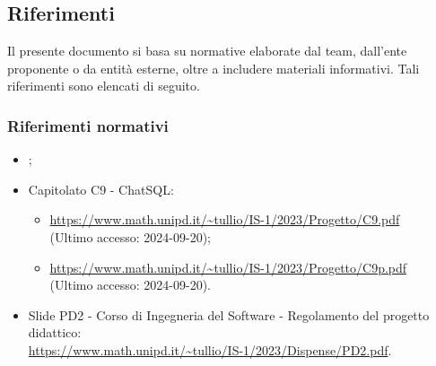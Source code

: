 \subsection{Riferimenti}
Il presente documento si basa su normative elaborate dal team, dall'ente proponente o da entità esterne, oltre a includere materiali informativi. Tali riferimenti sono elencati di seguito.
\subsubsection{Riferimenti normativi}
\begin{itemize}
  \item \NormeDiProgetto;
  \item Capitolato C9 - ChatSQL:
  \begin{itemize}
    \item \href{https://www.math.unipd.it/~tullio/IS-1/2023/Progetto/C9.pdf}{https://www.math.unipd.it/\textasciitilde tullio/IS-1/2023/Progetto/C9.pdf} \\ (Ultimo accesso: 2024-09-20);
    \item \href{https://www.math.unipd.it/~tullio/IS-1/2023/Progetto/C9.pdf}{https://www.math.unipd.it/\textasciitilde tullio/IS-1/2023/Progetto/C9p.pdf} \\ (Ultimo accesso: 2024-09-20).
  \end{itemize}
  \item Slide PD2 - Corso di Ingegneria del Software - Regolamento del progetto didattico:\\ \href{https://www.math.unipd.it/~tullio/IS-1/2023/Dispense/PD2.pdf}{https://www.math.unipd.it/\textasciitilde tullio/IS-1/2023/Dispense/PD2.pdf}.
\end{itemize}

